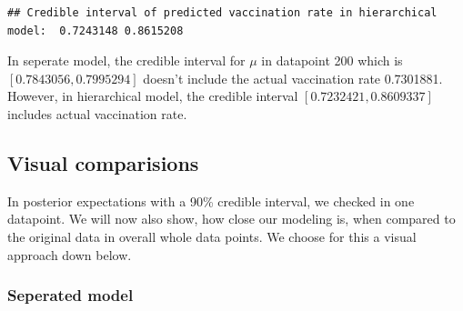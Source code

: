 \documentclass[
]{article}
\begin{document}
\begin{verbatim}
## Credible interval of predicted vaccination rate in hierarchical model:  0.7243148 0.8615208
\end{verbatim}

In seperate model, the credible interval for \(\mu\) in datapoint 200
which is \([0.7843056, 0.7995294]\) doesn't include the actual
vaccination rate 0.7301881. However, in hierarchical model, the credible
interval \([0.7232421, 0.8609337]\) includes actual vaccination rate.

\hypertarget{visual-comparisions}{%
\subsection{Visual comparisions}\label{visual-comparisions}}

In posterior expectations with a 90\% credible interval, we checked in
one datapoint. We will now also show, how close our modeling is, when
compared to the original data in overall whole data points. We choose
for this a visual approach down below.

\hypertarget{seperated-model-1}{%
\subsubsection{Seperated model}\label{seperated-model-1}}
\end{document}
